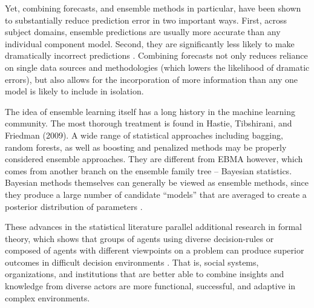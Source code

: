 

Yet, combining forecasts, and ensemble methods in particular, have
been shown to substantially reduce prediction error in two important
ways.  First, across subject domains, ensemble predictions are usually
more accurate than any individual component model. Second, they are
significantly less likely to make dramatically incorrect predictions
\citep{Bates:1969, Armstrong:2001, Raftery:2005}.  Combining forecasts not only
reduces reliance on single data sources and methodologies (which
lowers the likelihood of dramatic errors), but also allows for the
incorporation of more information than any one model is likely to
include in isolation.

The idea of ensemble learning itself has a long history in the machine
learning community. The most thorough treatment is found in Hastie,
Tibshirani, and Friedman (2009).  A wide range of statistical
approaches including bagging, random forests, as well as boosting and
penalized methods may be properly considered ensemble approaches. They
are different from EBMA however, which comes from another branch on
the ensemble family tree -- Bayesian statistics.  Bayesian methods
themselves can generally be viewed as ensemble methods, since they
produce a large number of candidate ``models'' that are averaged to
create a posterior distribution of parameters
\citep[p. 605]{Hastie:2009}.

These advances in the statistical literature parallel additional
research in formal theory, which shows that groups of agents using
diverse decision-rules or composed of agents with different viewpoints
on a problem can produce superior outcomes in difficult decision
environments \citep{Page:2007, Page:2008, Page:2011}.  That is, social
systems, organizations, and institutions that are better able to
combine insights and knowledge from diverse actors are more
functional, successful, and adaptive in complex environments.  

